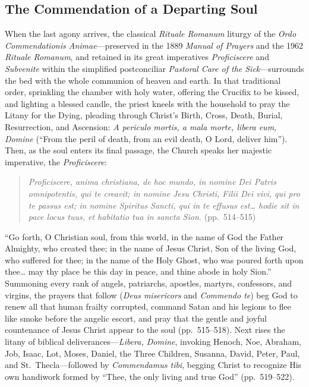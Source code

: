 \subsection{The Commendation of a Departing Soul}

When the last agony arrives, the classical \emph{Rituale Romanum} liturgy of the \emph{Ordo Commendationis Animae}---preserved in the 1889 \emph{Manual of Prayers} and the 1962 \emph{Rituale Romanum}, and retained in its great imperatives \emph{Proficiscere} and \emph{Subvenite} within the simplified postconciliar \emph{Pastoral Care of the Sick}---surrounds the bed with the whole communion of heaven and earth. In that traditional order, sprinkling the chamber with holy water, offering the Crucifix to be kissed, and lighting a blessed candle, the priest kneels with the household to pray the Litany for the Dying, pleading through Christ's Birth, Cross, Death, Burial, Resurrection, and Ascension: \emph{A periculo mortis, a mala morte, libera eum, Domine} (``From the peril of death, from an evil death, O Lord, deliver him''). Then, as the soul enters its final passage, the Church speaks her majestic imperative, the \emph{Proficiscere}:

\begin{quote}
\emph{Proficiscere, anima christiana, de hoc mundo, in nomine Dei Patris omnipotentis, qui te creavit; in nomine Jesu Christi, Filii Dei vivi, qui pro te passus est; in nomine Spiritus Sancti, qui in te effusus est\ldots{} hodie sit in pace locus tuus, et habitatio tua in sancta Sion.} (pp.\ 514--515)
\end{quote}

``Go forth, O Christian soul, from this world, in the name of God the Father Almighty, who created thee; in the name of Jesus Christ, Son of the living God, who suffered for thee; in the name of the Holy Ghost, who was poured forth upon thee\ldots{} may thy place be this day in peace, and thine abode in holy Sion.'' Summoning every rank of angels, patriarchs, apostles, martyrs, confessors, and virgins, the prayers that follow (\emph{Deus misericors} and \emph{Commendo te}) beg God to renew all that human frailty corrupted, command Satan and his legions to flee like smoke before the angelic escort, and pray that the gentle and joyful countenance of Jesus Christ appear to the soul (pp.\ 515--518). Next rises the litany of biblical deliverances---\emph{Libera, Domine}, invoking Henoch, Noe, Abraham, Job, Isaac, Lot, Moses, Daniel, the Three Children, Susanna, David, Peter, Paul, and St.\ Thecla---followed by \emph{Commendamus tibi}, begging Christ to recognize His own handiwork formed by ``Thee, the only living and true God'' (pp.\ 519--522).

